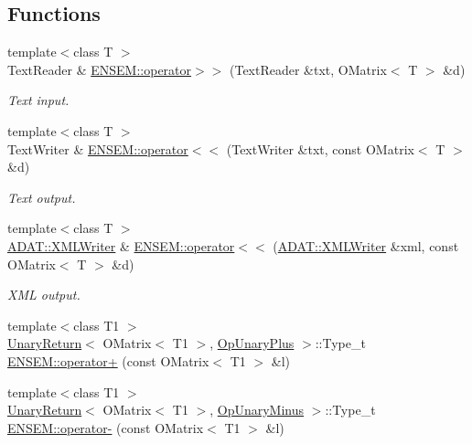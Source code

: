 \subsection*{Functions}
\begin{DoxyCompactItemize}
\item 
{\footnotesize template$<$class T $>$ }\\Text\+Reader \& \mbox{\hyperlink{group__obsmatrix_ga2c0b293dbb7aeff91ccffc12fdb0e858}{E\+N\+S\+E\+M\+::operator$>$$>$}} (Text\+Reader \&txt, O\+Matrix$<$ T $>$ \&d)
\begin{DoxyCompactList}\small\item\em Text input. \end{DoxyCompactList}\item 
{\footnotesize template$<$class T $>$ }\\Text\+Writer \& \mbox{\hyperlink{group__obsmatrix_gacdc76da3bc2873feb9cad8323ea02e83}{E\+N\+S\+E\+M\+::operator$<$$<$}} (Text\+Writer \&txt, const O\+Matrix$<$ T $>$ \&d)
\begin{DoxyCompactList}\small\item\em Text output. \end{DoxyCompactList}\item 
{\footnotesize template$<$class T $>$ }\\\mbox{\hyperlink{classADATXML_1_1XMLWriter}{A\+D\+A\+T\+::\+X\+M\+L\+Writer}} \& \mbox{\hyperlink{group__obsmatrix_ga62a405af58665d9bce46afb03abd8c90}{E\+N\+S\+E\+M\+::operator$<$$<$}} (\mbox{\hyperlink{classADATXML_1_1XMLWriter}{A\+D\+A\+T\+::\+X\+M\+L\+Writer}} \&xml, const O\+Matrix$<$ T $>$ \&d)
\begin{DoxyCompactList}\small\item\em X\+ML output. \end{DoxyCompactList}\item 
{\footnotesize template$<$class T1 $>$ }\\\mbox{\hyperlink{structUnaryReturn}{Unary\+Return}}$<$ O\+Matrix$<$ T1 $>$, \mbox{\hyperlink{structOpUnaryPlus}{Op\+Unary\+Plus}} $>$\+::Type\+\_\+t \mbox{\hyperlink{group__obsmatrix_gae4d0316e65f7b3ddc273955cf4801ba6}{E\+N\+S\+E\+M\+::operator+}} (const O\+Matrix$<$ T1 $>$ \&l)
\item 
{\footnotesize template$<$class T1 $>$ }\\\mbox{\hyperlink{structUnaryReturn}{Unary\+Return}}$<$ O\+Matrix$<$ T1 $>$, \mbox{\hyperlink{structOpUnaryMinus}{Op\+Unary\+Minus}} $>$\+::Type\+\_\+t \mbox{\hyperlink{group__obsmatrix_gaf8abde7e3428822593f11a4317f48880}{E\+N\+S\+E\+M\+::operator-\/}} (const O\+Matrix$<$ T1 $>$ \&l)

\end{DoxyCompactItemize}
